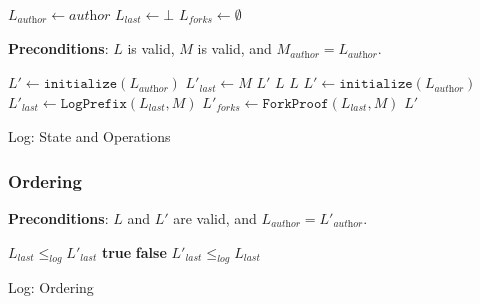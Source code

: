 \documentclass[9pt, oneside]{article}   	%
\newcommand{\logleadsto}{\overset{\textit{log}}\leadsto}
\begin{document}
\begin{algorithm}
\begin{algorithmic}[1]


		\State $L_\textit{author} \leftarrow \textit{author}$
		\State $L_\textit{last} \leftarrow \bot$
		\State $L_\textit{forks} \leftarrow \emptyset$
	\EndFunction
	\State
	
		\State \textbf{Preconditions}:  $L$ is valid, $M$ is valid, and $M_\textit{author} = L_\textit{author}$.
		\State

			\If{$L_\textit{last} \logleadsto M$} 
				\State $L' \leftarrow \texttt{initialize}(L_\textit{author})$
				\State $L'_\textit{last} \leftarrow M$
				\State \Return $L'$
			 
				\State \Return $L$	
			\EndIf
		 
			\State \Return $L$
		\EndIf
		\State
		\State $L' \leftarrow \texttt{initialize}(L_\textit{author})$  \label{alg:log:fork-handling}
		\State $L'_\textit{last} \leftarrow \texttt{LogPrefix}(L_\textit{last},M)$ 
		\State $L'_\textit{forks} \leftarrow \texttt{ForkProof}(L_\textit{last},M)$	
		\State \Return $L'$
	\EndFunction
\end{algorithmic}
\caption{\label{alg:log} Log: State and Operations}
\end{algorithm}


\subsubsection{Ordering}
\label{sec:design:log:ordering}

\begin{algorithm}
\begin{algorithmic}[1]
	\State \textbf{Preconditions}: $L$ and $L'$ are valid, and $L_\textit{author} = L'_\textit{author}$.
	\State
	
		\State \Return $L_\textit{last} \leq_\textit{log} L'_\textit{last}$ 
		\State \Return \textbf{true}  
		\State \Return \textbf{false} 
	\Else
		\State \Return $L'_\textit{last} \leq_\textit{log} L_\textit{last}$ 
	\EndIf
\EndFunction	
\end{algorithmic}
\caption{\label{alg:log:ordering} Log: Ordering}
\end{algorithm}
\end{document}
